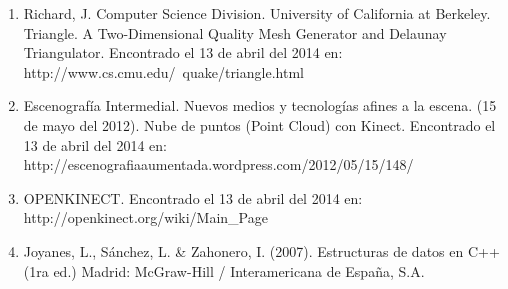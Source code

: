 \documentclass[letterpaper]{article}
\begin{document}
\begin{enumerate}

\item Richard, J. Computer Science Division. University of California at Berkeley. Triangle. A Two-Dimensional Quality Mesh Generator and 
Delaunay Triangulator. Encontrado el 13 de abril del 2014 en: http://www.cs.cmu.edu/~quake/triangle.html
\item Escenografía Intermedial. Nuevos medios y tecnologías afines a la escena. (15 de mayo del 2012).
Nube de puntos (Point Cloud) con Kinect. Encontrado el 13 de abril del 2014 en: http://escenografiaaumentada.wordpress.com/2012/05/15/148/
\item OPENKINECT. Encontrado el 13 de abril del 2014 en: http://openkinect.org/wiki/Main\_Page
\item Joyanes, L., Sánchez, L. \& Zahonero, I. (2007). Estructuras de datos en C++ (1ra ed.) Madrid: McGraw-Hill / Interamericana de España, S.A.



\end{enumerate}

	
\end{document}
